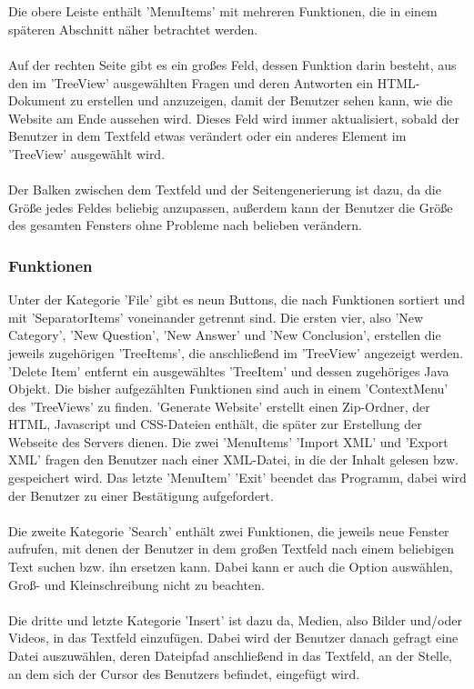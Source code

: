 \\
\\
Die obere Leiste enthält 'MenuItems' mit mehreren Funktionen, die in einem späteren Abschnitt näher betrachtet werden.
\\
\\
Auf der rechten Seite gibt es ein großes Feld, dessen Funktion darin besteht, aus den im 'TreeView' ausgewählten Fragen und deren Antworten ein HTML-Dokument zu erstellen und anzuzeigen, damit der Benutzer sehen kann, wie die Website am Ende aussehen wird. Dieses Feld wird immer aktualisiert, sobald der Benutzer in dem Textfeld etwas verändert oder ein anderes Element im 'TreeView' ausgewählt wird.
\\
\\
Der Balken zwischen dem Textfeld und der Seitengenerierung ist dazu, da die Größe jedes Feldes beliebig anzupassen, außerdem kann der Benutzer die Größe des gesamten Fensters ohne Probleme nach belieben verändern.

\subsubsection*{Funktionen}
Unter der Kategorie 'File' gibt es neun Buttons, die nach Funktionen sortiert und mit 'SeparatorItems' voneinander getrennt sind. Die ersten vier, also 'New Category', 'New Question', 'New Answer' und 'New Conclusion', erstellen die jeweils zugehörigen 'TreeItems', die anschließend im 'TreeView' angezeigt werden. 'Delete Item' entfernt ein ausgewähltes 'TreeItem' und dessen zugehöriges Java Objekt. Die bisher aufgezählten Funktionen sind auch in einem 'ContextMenu' des 'TreeViews' zu finden. 'Generate Website' erstellt einen Zip-Ordner, der HTML, Javascript und CSS-Dateien enthält, die später zur Erstellung der Webseite des Servers dienen. Die zwei 'MenuItems' 'Import XML' und 'Export XML' fragen den Benutzer nach einer XML-Datei, in die der Inhalt gelesen bzw. gespeichert wird. Das letzte 'MenuItem' 'Exit'  beendet das Programm, dabei wird der Benutzer zu einer Bestätigung aufgefordert.
\\
\\
Die zweite Kategorie 'Search' enthält zwei Funktionen, die jeweils neue Fenster aufrufen, mit denen der Benutzer in dem großen Textfeld nach einem beliebigen Text suchen bzw. ihn ersetzen kann. Dabei kann er auch die Option auswählen, Groß- und Kleinschreibung nicht zu beachten. 
\\
\\
Die dritte und letzte Kategorie 'Insert' ist dazu da, Medien, also Bilder und/oder Videos, in das Textfeld einzufügen. Dabei wird der Benutzer danach gefragt eine Datei auszuwählen, deren Dateipfad anschließend in das Textfeld, an der Stelle, an dem sich der Cursor des Benutzers befindet, eingefügt wird. 
\\
\\
